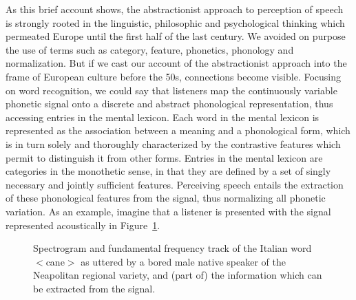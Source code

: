 As this brief account shows, the abstractionist approach to perception of speech is strongly rooted in the linguistic, philosophic and psychological thinking which permeated Europe until the first half of the last century. We avoided on purpose the use of terms such as category, feature, phonetics, phonology and normalization. But if we cast our account of the abstractionist approach into the frame of European culture before the 50s, connections become visible. Focusing on word recognition, we could say that listeners map the continuously variable phonetic signal onto a discrete and abstract phonological representation, thus accessing entries in the mental lexicon. Each word in the mental lexicon is represented as the association between a meaning and a phonological form, which is in turn solely and thoroughly characterized by the contrastive features which permit to distinguish it from other forms. Entries in the mental lexicon are categories in the monothetic sense, in that they are defined by a set of singly necessary and jointly sufficient features. Perceiving speech entails the extraction of these phonological features from the signal, thus normalizing all phonetic variation. As an example, imagine that a listener is presented with the signal represented acoustically in Figure~\ref{fig101}. 

\begin{figure}
\centering
{}
\caption{Spectrogram and fundamental frequency track of the Italian word $<$cane$>$ as uttered by a bored male native speaker of the Neapolitan regional variety, and (part of) the information which can be extracted from the signal.}
\label{fig101}\end{figure}

